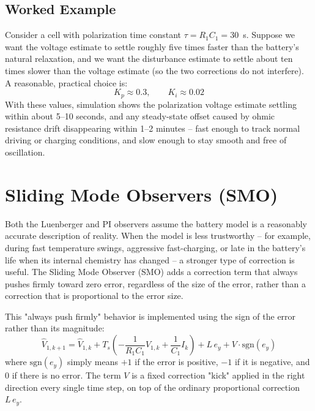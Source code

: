 \subsection{Worked Example}
Consider a cell with polarization time constant $\tau = R_1 C_1 = 30$~s. Suppose we want the voltage estimate to settle roughly five times faster than the battery's natural relaxation, and we want the disturbance estimate to settle about ten times slower than the voltage estimate (so the two corrections do not interfere). A reasonable, practical choice is:
\begin{equation}
K_p \approx 0.3, \qquad K_i \approx 0.02
\end{equation}
With these values, simulation shows the polarization voltage estimate settling within about 5--10 seconds, and any steady-state offset caused by ohmic resistance drift disappearing within 1--2 minutes -- fast enough to track normal driving or charging conditions, and slow enough to stay smooth and free of oscillation.


\section{Sliding Mode Observers (SMO)}
\label{sec:sliding_mode_observers}

Both the Luenberger and PI observers assume the battery model is a reasonably accurate description of reality. When the model is less trustworthy -- for example, during fast temperature swings, aggressive fast-charging, or late in the battery's life when its internal chemistry has changed -- a stronger type of correction is useful. The Sliding Mode Observer (SMO) adds a correction term that always pushes firmly toward zero error, regardless of the size of the error, rather than a correction that is proportional to the error size.

This "always push firmly" behavior is implemented using the sign of the error rather than its magnitude:
\begin{equation}
\hat{V}_{1,k+1} = \hat{V}_{1,k} + T_s\left(-\frac{1}{R_1C_1}\hat{V}_{1,k} + \frac{1}{C_1}I_k\right) + L\,e_y + V \cdot \text{sgn}(e_y)
\label{eq:ch6_smo_definition}
\end{equation}
where $\text{sgn}(e_y)$ simply means $+1$ if the error is positive, $-1$ if it is negative, and $0$ if there is no error. The term $V$ is a fixed correction "kick" applied in the right direction every single time step, on top of the ordinary proportional correction $L\,e_y$.

